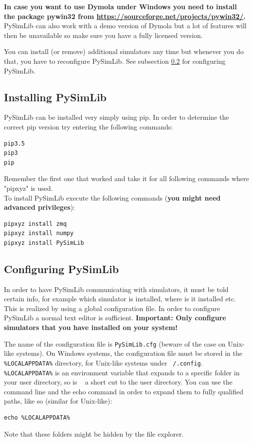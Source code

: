 \textbf{In case you want to use Dymola under Windows you need to install the package \grqq{}pywin32\grqq{} from \url{https://sourceforge.net/projects/pywin32/}.}
PySimLib can also work with a demo version of Dymola but a lot of features will then be unavailable so make sure you have a fully licensed version.

You can install (or remove) additional simulators any time but whenever you do that, you have to reconfigure PySimLib.
See subsection \ref{configuringPySimLib} for configuring PySimLib.





\subsection{Installing PySimLib}

PySimLib can be installed very simply using pip.
In order to determine the correct pip version try entering the following commands:
\lstset{language=bash}
\begin{lstlisting}
pip3.5
pip3
pip
\end{lstlisting}

Remember the first one that worked and take it for all following commands where "pipxyz" is used.
\\
To install PySimLib execute the following commands (\textbf{you might need advanced privileges}):
\begin{lstlisting}
pipxyz install zmq
pipxyz install numpy
pipxyz install PySimLib
\end{lstlisting}






\subsection{Configuring PySimLib}
\label{configuringPySimLib}

In order to have PySimLib communicating with simulators, it must be told certain info, for example which simulator is installed, where is it installed etc.
This is realized by using a global configuration file.
In order to configure PySimLib a normal text editor is sufficient.
\textbf{Important: Only configure simulators that you have installed on your system!}

The name of the configuration file is \texttt{PySimLib.cfg} (beware of the case on Unix-like systems).
On Windows systems, the configuration file must be stored in the \texttt{\%LOCALAPPDATA\%} directory, for Unix-like systems under \texttt{~/.config}.
\texttt{\%LOCALAPPDATA\%} is an environment variable that expands to a specific folder in your user directory, so is \grqq{}~\grqq{} a short cut to the user directory.
You can use the command line and the \grqq{}echo\grqq{} command in order to expand them to fully qualified paths, like so (similar for Unix-like):
\lstset{language=bash}
\begin{lstlisting}
echo %LOCALAPPDATA%
\end{lstlisting}
Note that these folders might be hidden by the file explorer.

